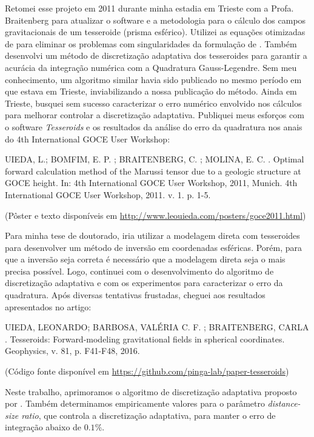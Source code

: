 Retomei esse projeto em 2011 durante minha estadia em Trieste com a Profa.
Braitenberg para atualizar o software e a metodologia para o cálculo dos campos
gravitacionais de um tesseroide (prisma esférico).
Utilizei as equações otimizadas de \citet{grombein2013} para eliminar os
problemas com singularidades da formulação de \citet{wild-pfeiffer2008}.
Também desenvolvi um método de discretização adaptativa dos tesseroides para
garantir a acurácia da integração numérica com a Quadratura Gauss-Legendre.
Sem meu conhecimento, um algoritmo similar \citep{li2011} havia sido publicado
no mesmo período em que estava em Trieste, inviabilizando a nossa publicação do
método.
Ainda em Trieste, busquei sem sucesso caracterizar o erro numérico envolvido
nos cálculos para melhorar controlar a discretização adaptativa.
Publiquei meus esforços com o software \textit{Tesseroids} e os resultados da
análise do erro da quadratura nos anais do 4th International GOCE User
Workshop:

\begin{displayquote}
    UIEDA, L.; BOMFIM, E. P. ; BRAITENBERG, C. ; MOLINA, E. C. . Optimal
    forward calculation method of the Marussi tensor due to a geologic
    structure at GOCE height. In: 4th International GOCE User Workshop, 2011,
    Munich. 4th International GOCE User Workshop, 2011. v. 1. p. 1-5.

    (Pôster e texto disponíveis em
    \url{http://www.leouieda.com/posters/goce2011.html})
\end{displayquote}

Para minha tese de doutorado, iria utilizar a modelagem direta com tesseroides
para desenvolver um método de inversão em coordenadas esféricas.
Porém, para que a inversão seja correta é necessário que a modelagem direta
seja o mais precisa possível.
Logo, continuei com o desenvolvimento do algoritmo de discretização adaptativa
e com os experimentos para caracterizar o erro da quadratura.
Após diversas tentativas frustadas, cheguei aos resultados apresentados no
artigo:

\begin{displayquote}
    UIEDA, LEONARDO; BARBOSA, VALÉRIA C. F. ; BRAITENBERG, CARLA . Tesseroids:
    Forward-modeling gravitational fields in spherical coordinates. Geophysics,
    v. 81, p. F41-F48, 2016.

    (Código fonte disponível em
    \url{https://github.com/pinga-lab/paper-tesseroids})
\end{displayquote}

Neste trabalho, aprimoramos o algoritmo de discretização adaptativa proposto
por \citet{li2011}.
Também determinamos empiricamente valores para o parâmetro
\textit{distance-size ratio}, que controla a discretização adaptativa,
para manter o erro de integração abaixo de $0.1\%$.

